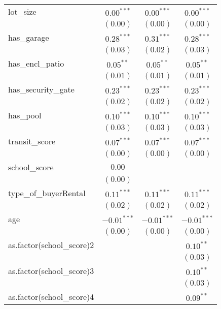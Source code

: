 \begin{center}
\begin{longtable}{l c c c}
lot\_size                  & $0.00^{***}$  & $0.00^{***}$  & $0.00^{***}$  \\
                           & $(0.00)$      & $(0.00)$      & $(0.00)$      \\
has\_garage                & $0.28^{***}$  & $0.31^{***}$  & $0.28^{***}$  \\
                           & $(0.03)$      & $(0.02)$      & $(0.03)$      \\
has\_encl\_patio           & $0.05^{**}$   & $0.05^{**}$   & $0.05^{**}$   \\
                           & $(0.01)$      & $(0.01)$      & $(0.01)$      \\
has\_security\_gate        & $0.23^{***}$  & $0.23^{***}$  & $0.23^{***}$  \\
                           & $(0.02)$      & $(0.02)$      & $(0.02)$      \\
has\_pool                  & $0.10^{***}$  & $0.10^{***}$  & $0.10^{***}$  \\
                           & $(0.03)$      & $(0.03)$      & $(0.03)$      \\
transit\_score             & $0.07^{***}$  & $0.07^{***}$  & $0.07^{***}$  \\
                           & $(0.00)$      & $(0.00)$      & $(0.00)$      \\
school\_score              & $0.00$        &               &               \\
                           & $(0.00)$      &               &               \\
type\_of\_buyerRental      & $0.11^{***}$  & $0.11^{***}$  & $0.11^{***}$  \\
                           & $(0.02)$      & $(0.02)$      & $(0.02)$      \\
age                        & $-0.01^{***}$ & $-0.01^{***}$ & $-0.01^{***}$ \\
                           & $(0.00)$      & $(0.00)$      & $(0.00)$      \\
as.factor(school\_score)2  &               &               & $0.10^{**}$   \\
                           &               &               & $(0.03)$      \\
as.factor(school\_score)3  &               &               & $0.10^{**}$   \\
                           &               &               & $(0.03)$      \\
as.factor(school\_score)4  &               &               & $0.09^{**}$   \\

\end{longtable}
\end{center}

